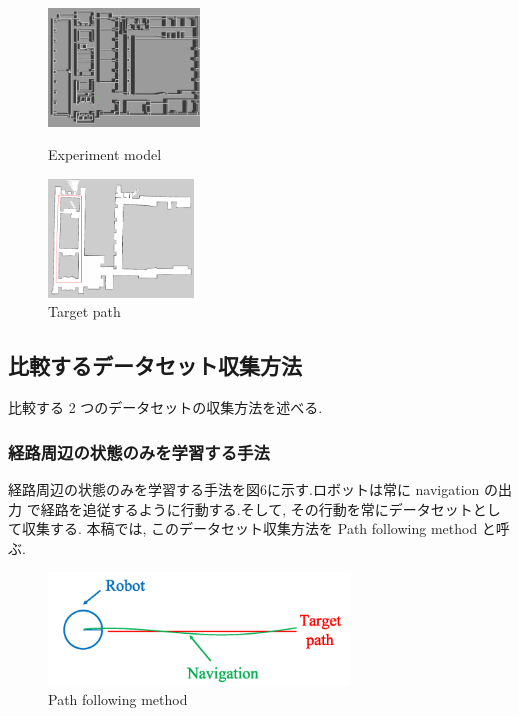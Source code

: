 \documentclass{jarticle}
\begin{document}
\begin{figure}[htbp]
  \begin{minipage}{0.5\hsize}
   \centering
   \includegraphics[width=40.1mm]{figs/gazebo.png}
   \caption{Experiment model}
  \end{minipage}
  \begin{minipage}{0.5\hsize}
   \centering
   \includegraphics[width=38.5mm]{figs/rviz.png}
   \caption{Target path}
  \end{minipage}
 \end{figure}


\subsection{比較するデータセット収集方法}
比較する 2 つのデータセットの収集方法を述べる.\\

\subsubsection{経路周辺の状態のみを学習する手法}
経路周辺の状態のみを学習する手法を図6に示す.ロボットは常に navigation の出力
で経路を追従するように行動する.そして, その行動を常にデータセットとして収集する.
本稿では, このデータセット収集方法を Path following method と呼ぶ.

\begin{figure}[h!]
  \centering
   \includegraphics[height=30mm]{./figs/dl.png}
   \caption{Path following method}
\end{figure}
\end{document}
